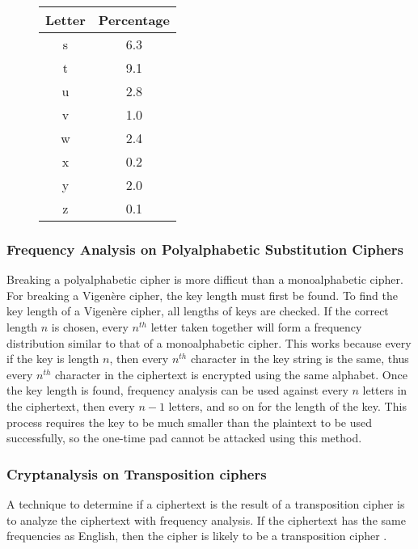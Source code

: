 \documentclass[12pt]{article}
\begin{document}
\begin{figure}[ht]
\begin{center}
\begin{multicols}{3}
			\columnbreak
			
			\begin{tabular}{||c | c||}
				\hline
				Letter & Percentage \\
				\hline\hline
				s & 6.3 \\ 
				\hline 
				t & 9.1 \\
				\hline 
				u & 2.8 \\
				\hline 
				v & 1.0 \\
				\hline 
				w & 2.4 \\
				\hline
				x & 0.2 \\
				\hline
				y & 2.0 \\
				\hline 
				z & 0.1 \\
				\hline 
			\end{tabular}
		\end{multicols}
	\end{center}
	\begin{flushright}
		\cite[pg. 19]{codebook}
	\end{flushright}
\end{figure}
\subsubsection{Frequency Analysis on Polyalphabetic Substitution Ciphers}
Breaking a polyalphabetic cipher is more difficut than a monoalphabetic cipher. For breaking a Vigen\`{e}re cipher, the key length must first be found. To find the key length of a Vigen\`{e}re cipher, all lengths of keys are checked. If the correct length $n$ is chosen, every $n^{th}$ letter taken together will form a frequency distribution similar to that of a monoalphabetic cipher. This works because every if the key is length $n$, then every $n^{th}$ character in the key string is the same, thus every $n^{th}$ character in the ciphertext is encrypted using the same alphabet. Once the key length is found, frequency analysis can be used against every $n$ letters in the ciphertext, then every $n-1$ letters, and so on for the length of the key. This process requires the key to be much smaller than the plaintext to be used successfully, so the one-time pad cannot be attacked using this method.

\subsubsection{Cryptanalysis on Transposition ciphers}
A technique to determine if a ciphertext is the result of a transposition cipher is to analyze the ciphertext with frequency analysis. If the ciphertext has the same frequencies as English, then the cipher is likely to be a transposition cipher \cite{appcrypt}.
\end{document}
